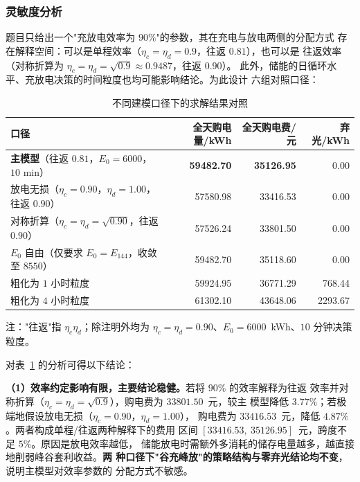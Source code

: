 \documentclass[withoutpreface,bwprint]{cumcmthesis}
\begin{document}
\subsubsection{灵敏度分析}

题目只给出一个"充放电效率为 $90\%$"的参数，其在充电与放电两侧的分配方式
存在解释空间：可以是单程效率（$\eta_c=\eta_d=0.9$，往返 $0.81$），也可以是
往返效率（对称折算为 $\eta_c=\eta_d=\sqrt{0.9}\approx0.9487$，往返 $0.90$）。
此外，储能的日循环水平、充放电决策的时间粒度也均可能影响结论。为此设计
六组对照口径：

\begin{table}[H]
  \centering
  \caption{不同建模口径下的求解结果对照}
  \label{tab:p1-sensitivity}
  \footnotesize
  \begin{tabular}{lrrr}
    \toprule
    口径 & 全天购电量/kWh & 全天购电费/元 & 弃光/kWh \\
    \midrule
    \textbf{主模型}（往返 $0.81$，$E_0=6000$，$10$ min）
      & \textbf{59482.70} & \textbf{35126.95} & 0.00 \\
    放电无损（$\eta_c=0.90$，$\eta_d=1.00$，往返 $0.90$）
      & 57580.98 & 33416.53 & 0.00 \\
    对称折算（$\eta_c=\eta_d=\sqrt{0.90}$，往返 $0.90$）
      & 57526.24 & 33801.50 & 0.00 \\
    $E_0$ 自由（仅要求 $E_0=E_{144}$，收敛至 $8550$）
      & 59482.70 & 35118.60 & 0.00 \\
    粗化为 $1$ 小时粒度
      & 59924.95 & 36771.29 & 768.44 \\
    粗化为 $4$ 小时粒度
      & 61302.10 & 43648.06 & 2293.67 \\
    \bottomrule
  \end{tabular}
  \par\vspace{2pt}
  \begin{minipage}{.92\textwidth}
    \footnotesize 注："往返"指 $\eta_c\eta_d$；除注明外均为
    $\eta_c=\eta_d=0.90$、$E_0=6000$~kWh、$10$ 分钟决策粒度。
  \end{minipage}
\end{table}

对表~\ref{tab:p1-sensitivity} 的分析可得以下结论：

\textbf{（1）效率约定影响有限，主要结论稳健。}若将 $90\%$ 的效率解释为往返
效率并对称折算（$\eta_c=\eta_d=\sqrt{0.9}$），购电费为 $33801.50$~元，较主
模型降低 $3.77\%$；若极端地假设放电无损（$\eta_c=0.90$，$\eta_d=1.00$），
购电费为 $33416.53$~元，降低 $4.87\%$。两者构成单程/往返两种解释下的费用
区间 $[33416.53,\ 35126.95]$~元，跨度不足 $5\%$。原因是放电效率越低，
储能放电时需额外多消耗的储存电量越多，越直接地削弱峰谷套利收益。\textbf{两
种口径下"谷充峰放"的策略结构与零弃光结论均不变}，说明主模型对效率参数的
分配方式不敏感。
\end{document}
